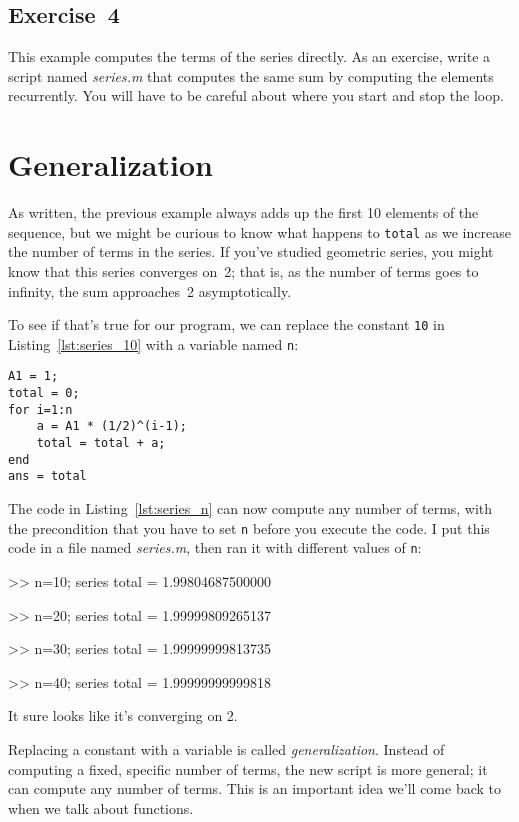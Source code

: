 \subsection{Exercise~4}
This example computes the terms of the series directly. As
an exercise, write a script named \emph{series.m} that computes
the same sum by computing the elements recurrently.  You will
have to be careful about where you start and stop the loop.


\section{Generalization}


As written, the previous example always adds up the first 10
elements of the sequence, but we might be curious to know what
happens to \lstinline{total} as we increase the
number of terms in the series.  If you've studied geometric
series, you might know that this series converges on~2; that is,
as the number of terms goes to infinity, the sum approaches~2 asymptotically.

To see if that's true for our program, we can replace the
constant \lstinline{10} in Listing~\ref{lst:series_10} with a variable named \lstinline{n}:

\begin{lstlisting}[caption={Updating our code from Listing~\ref{lst:series_10} to have a variable number of terms}, label={lst:series_n}]
A1 = 1;
total = 0;
for i=1:n
    a = A1 * (1/2)^(i-1);
    total = total + a;
end
ans = total
\end{lstlisting}

The code in Listing~\ref{lst:series_n} can now compute any number of terms, with the
precondition that you have to set \lstinline{n} before you execute
the code.  
I put this code in a file named \emph{series.m}, then
ran it with different values of \lstinline{n}:

\begin{code}
>> n=10; series
total = 1.99804687500000

>> n=20; series
total = 1.99999809265137

>> n=30; series
total = 1.99999999813735

>> n=40; series
total = 1.99999999999818
\end{code}

It sure looks like it's converging on 2.

Replacing a constant with a variable is called \emph{generalization}.
Instead of computing a fixed, specific number of terms, the new script
is more general; it can compute any number of terms.
This is an important idea we'll come back to when we talk about functions.

